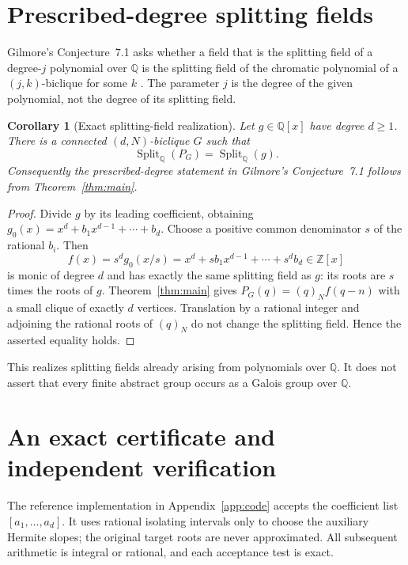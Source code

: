 \documentclass[11pt,a4paper]{article}
\newtheorem{corollary}[theorem]{Corollary}
\theoremstyle{definition}
\newcommand{\Z}{\mathbb Z}
\newcommand{\Q}{\mathbb Q}
\newcommand{\fall}[2]{(#1)_{#2}}
\newcommand{\Split}{\operatorname{Split}_{\Q}}
\begin{document}
\section{Prescribed-degree splitting fields}\label{sec:fields}

Gilmore's Conjecture~7.1 asks whether a field that is the splitting field
of a degree-$j$ polynomial over $\Q$ is the splitting field of the
chromatic polynomial of a $(j,k)$-biclique for some $k$
\cite[p.~63]{Gilmore}. The parameter $j$ is the degree of the given
polynomial, not the degree of its splitting field.

\begin{corollary}[Exact splitting-field realization]\label{cor:field}
Let $g\in\Q[x]$ have degree $d\ge1$. There is a connected
$(d,N)$-biclique $G$ such that
\[
 \Split(P_G)=\Split(g).
\]
Consequently the prescribed-degree statement in Gilmore's
Conjecture~7.1 follows from Theorem~\ref{thm:main}.
\end{corollary}
\begin{proof}
Divide $g$ by its leading coefficient, obtaining
$g_0(x)=x^d+b_1x^{d-1}+\cdots+b_d$.
Choose a positive common denominator $s$ of the rational $b_i$.
Then
\[
 f(x)=s^d g_0(x/s)
     =x^d+s b_1x^{d-1}+\cdots+s^d b_d\in\Z[x]
\]
is monic of degree $d$ and has exactly the same splitting field as $g$:
its roots are $s$ times the roots of $g$.
Theorem~\ref{thm:main} gives
$P_G(q)=\fall qN f(q-n)$ with a small clique of exactly $d$ vertices.
Translation by a rational integer and adjoining the rational roots of
$\fall qN$ do not change the splitting field. Hence the asserted
equality holds.
\end{proof}

This realizes splitting fields already arising from polynomials over
$\Q$. It does not assert that every finite abstract group occurs as a
Galois group over $\Q$.

\section{An exact certificate and independent verification}\label{sec:certificate}

The reference implementation in Appendix~\ref{app:code} accepts the
coefficient list $[a_1,\ldots,a_d]$. It uses rational isolating intervals
only to choose the auxiliary Hermite slopes; the original target roots
are never approximated. All subsequent arithmetic is integral or
rational, and each acceptance test is exact.
\end{document}
